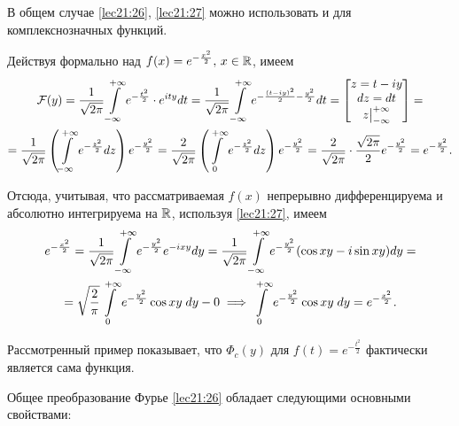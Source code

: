 \documentclass[../../main.tex]{subfiles}
\begin{document}
В общем случае \eqref{lec21:26}, \eqref{lec21:27} можно использовать и для  
комплекснозначных функций.

\begin{example}
  Действуя формально над  $f(x) = e^{-\frac{x^2}2}, \, x \in \mathbb{R}$, имеем
  \begin{multline*}
    \mathcal{F}(y) = \frac1{\sqrt{2\pi}}\int\limits_{-\infty}^{+\infty} e^{-\frac{t^2}2} \cdot e^{ity} dt = 
    \frac1{\sqrt{2\pi}}\int\limits_{-\infty}^{+\infty} e^{-\frac{(t-iy)^2}2-\frac{y^2}2} dt =
    \begin{bmatrix}
      z = t-iy \\
      dz = dt \\
      z \big|_{-\infty}^{+\infty}
    \end{bmatrix} =\\ =
    \frac1{\sqrt{2\pi}} \left(\int\limits_{-\infty}^{+\infty} e^{-\frac{z^2}2} dz\right)
    e^{-\frac{y^2}2} = \frac{2}{\sqrt{2\pi}}\left(\int\limits_{0}^{+\infty} 
    e^{-\frac{z^2}2} dz\right) e^{-\frac{y^2}2} = \frac{2}{\sqrt{2\pi}}\cdot
    \frac{\sqrt{2\pi}}{2}e^{-\frac{y^2}2} =  e^{-\frac{y^2}2}.
  \end{multline*}
  
  Отсюда, учитывая, что рассматриваемая $f(x)$ непрерывно дифференцируема и 
  абсолютно интегрируема на $\mathbb{R}$, используя \eqref{lec21:27}, имеем
  \begin{multline*}
    e^{-\frac{x^2}2} = \frac{1}{\sqrt{2\pi}}\int\limits_{-\infty}^{+\infty} e^{-\frac{y^2}2}e^{-ixy} 
    dy 
    =\frac{1}{\sqrt{2\pi}}\int\limits_{-\infty}^{+\infty} e^{-\frac{y^2}2}(\cos xy - i\sin xy) dy =\\= 
    \sqrt{\frac{2}{\pi}}\int\limits_{0}^{+\infty} e^{-\frac{y^2}2}\cos xy 
    \;dy - 
    0 \implies \int\limits_{0}^{+\infty} e^{-\frac{y^2}2}\cos xy\;dy = 
    e^{-\frac{x^2}2}.
  \end{multline*}
\end{example}

Рассмотренный пример показывает, что $\Phi_c(y)$ для $f(t) = e^{-\frac{t^2}2}$ 
фактически является сама функция.

Общее преобразование Фурье \eqref{lec21:26} обладает следующими основными
свойствами:
\end{document}
